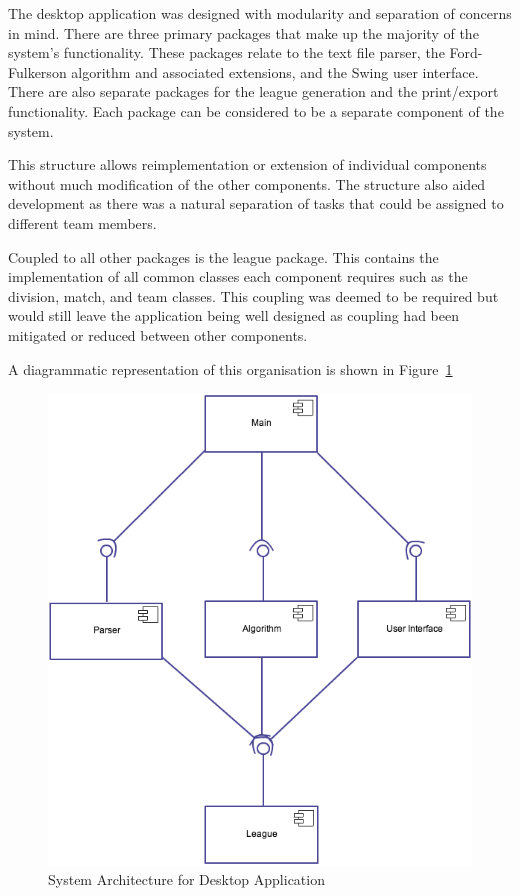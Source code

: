 The desktop application was designed with modularity and separation of concerns
in mind. There are three primary packages that make up the majority of the
system's functionality. These packages relate to the text file parser, the Ford-
Fulkerson algorithm and associated extensions, and the Swing user interface.
There are also separate packages for the league generation and the print/export
functionality. Each package can be considered to be a separate component of the
system.

This structure allows reimplementation or extension of individual components
without much modification of the other components. The structure also aided
development as there was a natural separation of tasks that could be assigned to
different team members.

Coupled to all other packages is the league package. This contains the
implementation of all common classes each component requires such as the
division, match, and team classes. This coupling was deemed to be required but
would still leave the application being well designed as coupling had been
mitigated or reduced between other components.

A diagrammatic representation of this organisation is shown in
Figure~\ref{fig:sysArch}

\begin{figure}
\includegraphics[width=\linewidth,keepaspectratio]
{images/DesktopApplicationSystemArchitecture.png}
\caption{System Architecture for Desktop Application}
\label{fig:sysArch}
\end{figure}
